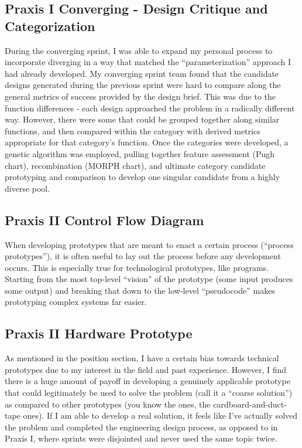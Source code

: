 \documentclass{report}
\begin{document}
\subsection{Praxis I Converging - Design Critique and Categorization}
During the converging sprint, I was able to expand my personal process to 
incorporate diverging in a way that matched the “parameterization” approach 
I had already developed. My converging sprint team found that the candidate 
designs generated during the previous sprint were hard to compare along the 
general metrics of success provided by the design brief. This was due to the 
function differences - each design approached the problem in a radically 
different way. However, there were some that could be grouped together along 
similar functions, and then compared within the category with derived metrics 
appropriate for that category’s function. Once the categories were developed, 
a genetic algorithm was employed, pulling together feature assessment 
(Pugh chart), recombination (MORPH chart), and ultimate category candidate 
prototyping and comparison to develop one singular candidate from a highly 
diverse pool.

\subsection{Praxis II Control Flow Diagram}
When developing prototypes that are meant to enact a certain process (“process 
prototypes”), it is often useful to lay out the process before any development 
occurs. This is especially true for technological prototypes, like programs. 
Starting from the most top-level “vision” of the prototype (some input produces 
some output) and breaking that down to the low-level “pseudocode” makes 
prototyping complex systems far easier.
\subsection{Praxis II Hardware Prototype}
As mentioned in the position section, I have a certain bias towards technical 
prototypes due to my interest in the field and past experience. However, I 
find there is a huge amount of payoff in developing a genuinely applicable 
prototype that could legitimately be used to solve the problem (call it a 
“coarse solution”) as compared to other prototypes (you know the ones, the 
cardboard-and-duct-tape ones). If I am able to develop a real solution, it 
feels like I’ve actually solved the problem and completed the engineering 
design process, as opposed to in Praxis I, where sprints were disjointed and 
never used the same topic twice.
\end{document}
